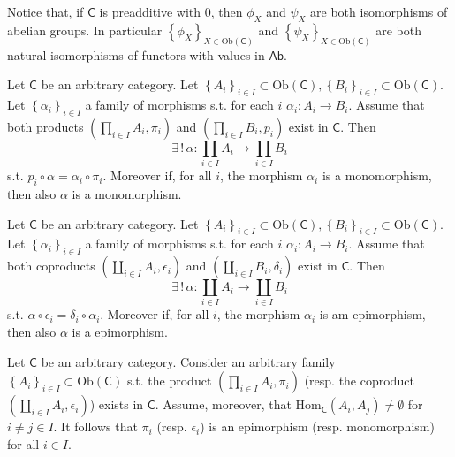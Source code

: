 \begin{rem}
	Notice that, if $\mathsf{C}$ is preadditive with $0$,
	then $\phi_X$ and $\psi_X$ are both isomorphisms of abelian groups.
	In particular $\left\{ \phi_X \right\}_{X \in \mathrm{Ob} \left(\mathsf{C}\right)}$ 
	and $\left\{ \psi_X \right\}_{X \in \mathrm{Ob} \left(\mathsf{C}\right)}$ are both natural
	isomorphisms of functors with values in $\mathsf{Ab}$.
\end{rem}

\begin{prop}
	Let $\mathsf{C}$ be an arbitrary category.
	Let $\left\{ A_i \right\}_{i \in I} \subset \mathrm{Ob} \left(\mathsf{C}\right),
	\left\{ B_i \right\}_{i \in I}
	\subset \mathrm{Ob} \left(\mathsf{C}\right)$.
	Let $\left\{ \alpha_i \right\}_{i \in I}$ a family of morphisms s.t. for each $i$ $\alpha_i\colon A_i \to B_i$.
	Assume that both products $\left(\prod_{i \in I} A_i , \pi_i\right)$ and $\left(\prod_{i \in I} B_i, p_i\right)$ exist in $\mathsf{C}$.
	Then 
	\begin{equation}
	\exists\, !\, \alpha\colon \prod_{i \in I} A_i  \to \prod_{i \in I} B_i
	\end{equation} 
	s.t. $p_i \circ \alpha = \alpha_i \circ \pi_i$.
	Moreover if, for all $i$, the morphism $\alpha_i$ is a monomorphism,
	then also $\alpha$ is a monomorphism.
\end{prop} 

\begin{prop}
	Let $\mathsf{C}$ be an arbitrary category.
	Let $\left\{ A_i \right\}_{i \in I} \subset \mathrm{Ob} \left(\mathsf{C}\right),
	\left\{ B_i \right\}_{i \in I}
	\subset \mathrm{Ob} \left(\mathsf{C}\right)$.
	Let $\left\{ \alpha_i \right\}_{i \in I}$ a family of morphisms s.t. for each $i$ $\alpha_i\colon A_i \to B_i$.
	Assume that both coproducts $\left(\coprod_{i \in I} A_i , \epsilon_i\right)$ and
	$\left(\coprod_{i \in I} B_i, \delta_i\right)$ exist in $\mathsf{C}$.
	Then 
	\begin{equation}
	\exists\, !\, \alpha\colon \coprod_{i \in I} A_i  \to \coprod_{i \in I} B_i
	\end{equation} 
	s.t. $\alpha \circ \epsilon_i = \delta_i \circ \alpha_i$.
	Moreover if, for all $i$, the morphism $\alpha_i$ is am epimorphism,
	then also $\alpha$ is a epimorphism.
\end{prop} 

\begin{prop}
	Let $\mathsf{C}$ be an arbitrary category.
	Consider an arbitrary family $\left\{ A_i \right\}_{i \in I} \subset \mathrm{Ob} \left(\mathsf{C}\right)$ s.t.
	the product $\left(\prod_{i \in I} A_i, \pi_i\right)$ (resp. the coproduct $\left(\coprod_{i \in I} A_i, \epsilon_i \right)$) exists in $\mathsf{C}$.
	Assume, moreover, that $\mathrm{Hom}_{\mathsf{C}} \left( A_i, A_j \right) \neq \emptyset$ for $i \neq j \in I$.
	It follows that $\pi_i$ (resp. $\epsilon_i$) is an epimorphism (resp. monomorphism) for all $i \in I$.
\end{prop} 

